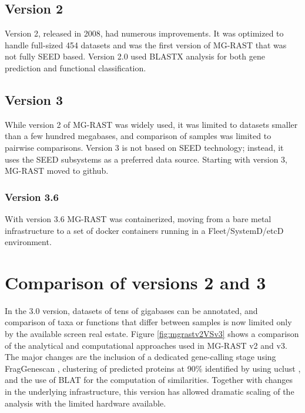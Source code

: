 \documentclass[12pt,fullpage]{report}
\begin{document}
\subsection*{Version 2}
Version 2, released in 2008, had numerous improvements. It was optimized to handle full-sized 454 datasets and was the first version of MG-RAST that was not fully \gls{SEED} based.
Version 2.0 used BLASTX analysis for both gene prediction and functional classification\cite{MG-RAST}.
\subsection*{Version 3}
While version 2 of MG-RAST was widely used, it was limited to datasets smaller than a few hundred megabases, and comparison of samples was limited to pairwise comparisons. Version 3 is not based on \gls{SEED} technology; instead, it uses the SEED subsystems as a preferred data source.
Starting with version 3, MG-RAST moved to github.
\subsubsection*{Version 3.6}
With version 3.6 MG-RAST was containerized,  moving from a bare metal infrastructure to a set of docker containers running in a Fleet/SystemD/etcD environment. 

\section{Comparison of versions 2 and 3}

In the 3.0 version, datasets of tens of gigabases can be annotated, and comparison of taxa or functions that differ between samples is now limited only by the available screen real estate. Figure \ref{fig:mgrastv2VSv3} shows a comparison of the analytical and computational approaches used in MG-RAST v2 and v3. The major changes are the inclusion of a dedicated gene-calling stage using FragGenescan \cite{FGS}, clustering of predicted proteins at 90\% identified by using uclust \cite{UCLUST}, and the use of BLAT \cite{BLAT} for the computation of similarities. Together with changes in the underlying infrastructure, this version has allowed dramatic scaling of the analysis with the limited hardware available.
\end{document}
